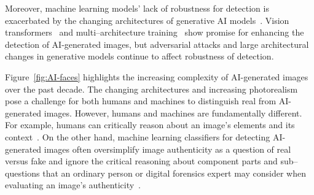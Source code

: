 Moreover, machine learning models' lack of robustness for detection is exacerbated by the changing architectures of generative AI models~\cite{lin2024, Mirsky2021}. Vision transformers~\cite{radford2021learning, ojha2024universalfakeimagedetectors} and multi--architecture training~\cite{epstein2023onlinedetectionaigeneratedimages, porcile2024findingaigeneratedfaceswild, jia2024can} show promise for enhancing the detection of AI-generated images, but adversarial attacks and large architectural changes in generative models continue to affect robustness of detection.  

Figure~\ref{fig:AI-faces} highlights the increasing complexity of AI-generated images over the past decade. The changing architectures and increasing photorealism pose a challenge for both humans and machines to distinguish real from AI-generated images. However, humans and machines are fundamentally different. For example, humans can critically reason about an image's elements and its context~\cite{wang2023context}. On the other hand, machine learning classifiers for detecting AI-generated images often oversimplify image authenticity as a question of real versus fake and ignore the critical reasoning about component parts and sub--questions that an ordinary person or digital forensics expert may consider when evaluating an image's authenticity~\cite{jacobsen2024deepfakes}.


